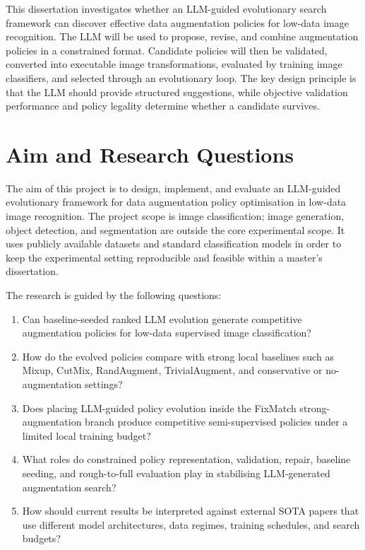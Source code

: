 \documentclass[12pt,a4paper]{report}
\begin{document}
This dissertation investigates whether an LLM-guided evolutionary search framework can discover effective data augmentation policies for low-data image recognition. The LLM will be used to propose, revise, and combine augmentation policies in a constrained format. Candidate policies will then be validated, converted into executable image transformations, evaluated by training image classifiers, and selected through an evolutionary loop. The key design principle is that the LLM should provide structured suggestions, while objective validation performance and policy legality determine whether a candidate survives.

\section{Aim and Research Questions}

The aim of this project is to design, implement, and evaluate an LLM-guided evolutionary framework for data augmentation policy optimisation in low-data image recognition. The project scope is image classification; image generation, object detection, and segmentation are outside the core experimental scope. It uses publicly available datasets and standard classification models in order to keep the experimental setting reproducible and feasible within a master's dissertation.

The research is guided by the following questions:

\begin{enumerate}[label=\textbf{RQ\arabic*:}, leftmargin=*]
    \item Can baseline-seeded ranked LLM evolution generate competitive augmentation policies for low-data supervised image classification?
    \item How do the evolved policies compare with strong local baselines such as Mixup, CutMix, RandAugment, TrivialAugment, and conservative or no-augmentation settings?
    \item Does placing LLM-guided policy evolution inside the FixMatch strong-augmentation branch produce competitive semi-supervised policies under a limited local training budget?
    \item What roles do constrained policy representation, validation, repair, baseline seeding, and rough-to-full evaluation play in stabilising LLM-generated augmentation search?
    \item How should current results be interpreted against external SOTA papers that use different model architectures, data regimes, training schedules, and search budgets?
\end{enumerate}
\end{document}
